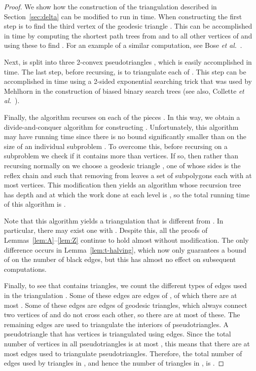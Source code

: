 \documentclass[lotsofwhite]{patmorin}
\newcommand{\secref}[1]{\mbox{Section~\ref{sec:#1}}}
\newcommand{\lemref}[1]{Lemma~\ref{lem:#1}}
\newcommand{\etal}{\emph{et al.}}
\begin{document}
\begin{proof}
We show how the construction of the triangulation  described in
\secref{delta} can be modified to run in  time.  When
constructing  the first step is to find the third vertex  of the
geodesic triangle .  This can be accomplished
in  time by computing the shortest path trees from  and
 to all other vertices of  and using these to find .  For
an example of a similar computation, see Bose \etal\
\cite[Section~2.2]{bdhlim07}.

Next,  is split into three 2-convex pseudotriangles ,
which is easily accomplished in  time.  The last step, before
recursing, is to triangulate each of .  This step can be
accomplished in  time using a 2-sided exponential searching
trick that was used by Mehlhorn \cite{m75} in the construction of
biased binary search trees (see also, Collette \etal\
\cite[Theorem~1]{cdilm08}).

Finally, the algorithm recurses on each of the pieces
.  In this way, we obtain a divide-and-conquer
algorithm for constructing .  Unfortunately, this algorithm
may have running time  since there is no bound
significantly smaller than  on the size of an individual subproblem
.  To overcome this, before recursing on a subproblem  we
check if it contains more than  vertices.  If so, then rather
than recursing normally on  we choose a geodesic triangle ,
one of whose sides is the reflex chain  and such that removing
 from  leaves a set of subpolygons
 each with at most  vertices.  This
modification then yields an algorithm whose recursion tree has depth
 and at which the work done at each level is , so the
total running time of this algorithm is .

Note that this algorithm yields a triangulation  that is
different from .  In particular, there may exist one 
with .  Despite this, all the proofs of
Lemmas~\ref{lem:A}--\ref{lem:Z} continue to hold almost without modification.
The only difference occurs in \lemref{t-halving}, which now only
guarantees a bound of  on the number of black edges,
but this has almost no effect on subsequent computations.

Finally, to see that  contains 
triangles, we count the different types of edges used in the
triangulation .  Some of these edges are edges of , of
which there are at most .  Some of these edges are edges of
geodesic triangles,
which always connect two vertices of  and do not cross each other,
so there are at most  of these.  The remaining edges are used to
triangulate the interiors of pseudotriangles.  A pseudotriangle that has  vertices
is triangulated using  edges.  Since the total number of
vertices in all pseudotriangles is at most , this means that there are at
most  edges used to triangulate pseudotriangles.  Therefore, the total
number of edges used by triangles in , and hence the number
of triangles in , is .  
\end{proof}
\end{document}
